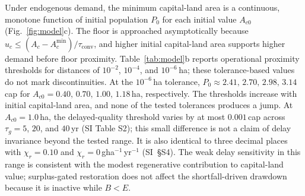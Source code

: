 \documentclass[preprint,12pt,authoryear]{elsarticle}
\newcommand{\Acmin}{A_c^{\min}}
\newcommand{\tconv}{\tau_{\mathrm{conv}}}
\begin{document}
Under endogenous demand, the minimum capital-land area is a continuous, monotone function of initial population $P_0$ for each initial value $A_{c0}$ (Fig.~\ref{fig:model}c). The floor is approached asymptotically because $u_c\le(A_c-\Acmin)/\tconv$, and higher initial capital-land area supports higher demand before floor proximity. Table~\ref{tab:model}b reports operational proximity thresholds for distances of $10^{-2}$, $10^{-4}$, and $10^{-6}$\,ha; these tolerance-based values do not mark discontinuities. At the $10^{-6}$\,ha tolerance, $P_0\approx2.41,\,2.70,\,2.98,\,3.14$\,cap for $A_{c0}=0.40,\,0.70,\,1.00,\,1.18$\,ha, respectively. The thresholds increase with initial capital-land area, and none of the tested tolerances produces a jump. At $A_{c0}=1.0$\,ha, the delayed-quality threshold varies by at most $0.001$\,cap across $\tau_g=5$, $20$, and $40$\,yr (SI Table S2); this small difference is not a claim of delay invariance beyond the tested range. It is also identical to three decimal places with $\chi_r=0.10$ and $\chi_r=0$\,gha$^{-1}$\,yr$^{-1}$ (SI~\S S4). The weak delay sensitivity in this range is consistent with the modest regenerative contribution to capital-land value; surplus-gated restoration does not affect the shortfall-driven drawdown because it is inactive while $B<E$.
\end{document}
